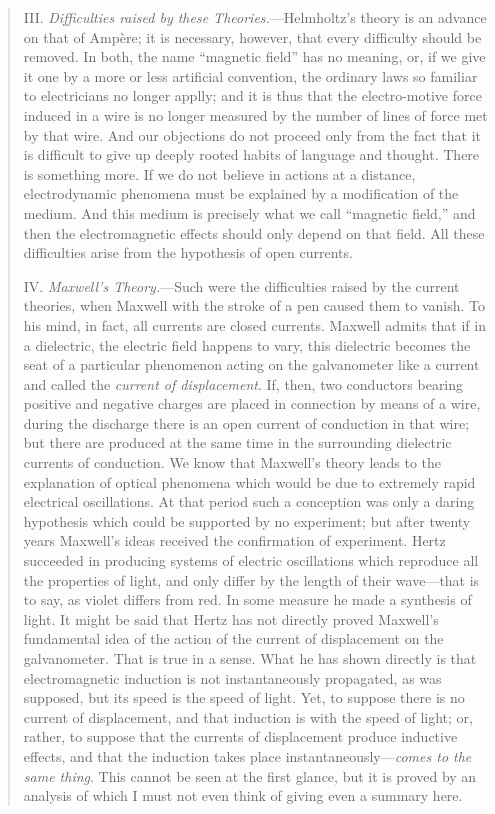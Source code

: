 \begin{quote}
    III. \emph{Difficulties raised by these Theories.}---Helmholtz's theory is an advance on that of Amp\`ere; it is necessary, however, that every difficulty should be removed.  In both, the name ``magnetic field'' has no meaning, or, if we give it one by a more or less artificial convention, the ordinary laws so familiar to electricians no longer applly; and it is thus that the electro-motive force induced in a wire is no longer measured by the number of lines of force met by that wire.  And our objections do not proceed only from the fact that it is difficult to give up deeply rooted habits of language and thought.  There is something more.  If we do not believe in actions at a distance, electrodynamic phenomena must be explained by a modification of the medium.  And this medium is precisely what we call ``magnetic field,'' and then the electromagnetic effects should only depend on that field.  All these difficulties arise from the hypothesis of open currents.
    
    IV.  \emph{Maxwell's Theory.}---Such were the difficulties raised by the current theories, when Maxwell with the stroke of a pen caused them to vanish.  To his mind, in fact, all currents are closed currents.  Maxwell admits that if in a dielectric, the electric field happens to vary, this dielectric becomes the seat of a particular phenomenon acting on the galvanometer like a current and called the \emph{current of displacement}.  If, then, two conductors bearing positive and negative charges are placed in connection by means of a wire, during the discharge there is an open current of conduction in that wire; but there are produced at the same time in the surrounding dielectric currents of conduction.  We know that Maxwell's theory leads to the explanation of optical phenomena which would be due to extremely rapid electrical oscillations.  At that period such a conception was only a daring hypothesis which could be supported by no experiment; but after twenty years Maxwell's ideas received the confirmation of experiment.  Hertz succeeded in producing systems of electric oscillations which reproduce all the properties of light, and only differ by the length of their wave---that is to say, as violet differs from red.  In some measure he made a synthesis of light.  It might be said that Hertz has not directly proved Maxwell's fundamental idea of the action of the current of displacement on the galvanometer.  That is true in a sense.  What he has shown directly is that electromagnetic induction is not instantaneously propagated, as was supposed, but its speed is the speed of light.  Yet, to suppose there is no current of displacement, and that induction is with the speed of light; or, rather, to suppose that the currents of displacement produce inductive effects, and that the induction takes place instantaneously---\emph{comes to the same thing}.  This cannot be seen at the first glance, but it is proved by an analysis of which I must not even think of giving even a summary here.
    
    \citep[p. 238-240]{Poincare1952}
\end{quote}


